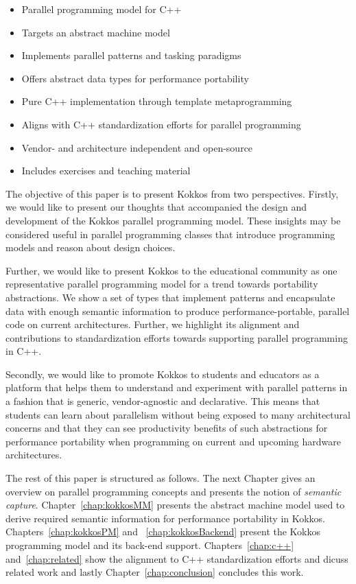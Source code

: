 \begin{itemize}
\item Parallel programming model for C++
\item Targets an abstract machine model
\item Implements parallel patterns and tasking paradigms
\item Offers abstract data types for performance portability
\item Pure C++ implementation through template metaprogramming
\item Aligns with C++ standardization efforts for parallel programming
\item Vendor- and architecture independent and open-source
\item Includes exercises and teaching material
\end{itemize}

The objective of this paper is to present Kokkos from two perspectives. Firstly, we would like to present our thoughts that accompanied the design and development of the Kokkos parallel programming model. These insights may be considered useful in parallel programming classes that introduce programming models and reason about design choices.

Further, we would like to present Kokkos to the educational community as one representative parallel programming model for a trend towards portability abstractions. We show a set of types that implement patterns and encapsulate data with enough semantic information to produce performance-portable, parallel code on current architectures. Further, we highlight its alignment and contributions to standardization efforts towards supporting parallel programming in C++. 

Secondly, we would like to promote Kokkos to students and educators as a platform that helps them to understand and experiment with parallel patterns in a fashion that is generic, vendor-agnostic and declarative. This means that students can learn about parallelism without being exposed to many architectural concerns and that they can see productivity benefits of such abstractions for performance portability when programming on current and upcoming hardware architectures.

The rest of this paper is structured as follows. The next Chapter gives an overview on parallel programming concepts and presents the notion of \emph{semantic capture}. Chapter~\ref{chap:kokkosMM} presents the abstract machine model used to derive required semantic information for performance portability in Kokkos. Chapters~\ref{chap:kokkosPM} and ~\ref{chap:kokkosBackend} present the Kokkos programming model and its back-end support. Chapters~\ref{chap:c++} and~\ref{chap:related} show the alignment to C++ standardization efforts and dicuss related work and lastly Chapter~\ref{chap:conclusion} concludes this work.

